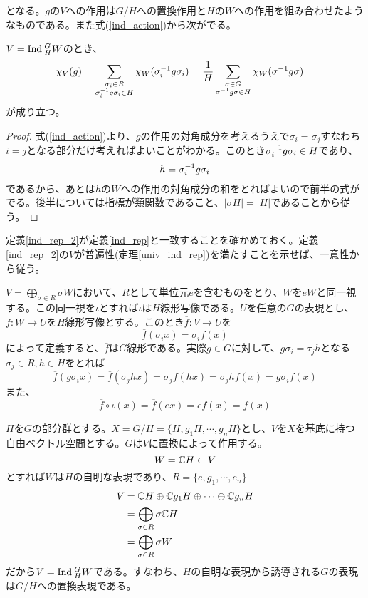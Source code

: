 \documentclass{ltjsreport}
\begin{document}
となる。$g$の$V$への作用は$G/H$への置換作用と$H$の$W$への作用を組み合わせたようなものである。また式(\ref{ind_action})から次がでる。

\begin{prop}[誘導表現の指標]\label{ind_char}
  $V=\text{Ind}\:_H^GW$のとき、
  \begin{align}
  \chi_V(g)&=\sum_{\substack{\sigma_i\in R \\ \sigma_i^{-1}g\sigma_i\in H}}\chi_W(\sigma_i^{-1}g\sigma_i)
  =\frac{1}{H}\sum_{\substack{\sigma\in G \\ \sigma^{-1}g\sigma\in H}}\chi_W(\sigma^{-1}g\sigma)
\end{align}
が成り立つ。
\end{prop}

\begin{proof}
  式(\ref{ind_action})より、$g$の作用の対角成分を考えるうえで$\sigma_i=\sigma_j$すなわち$i=j$となる部分だけ考えればよいことがわかる。このとき$\sigma_i^{-1}g\sigma_i\in H$であり、
  \[
  h=\sigma_i^{-1}g\sigma_i 
  \]
  であるから、あとは$h$の$W$への作用の対角成分の和をとればよいので前半の式がでる。後半については指標が類関数であること、$|\sigma H|=|H|$であることから従う。
\end{proof}

定義\ref{ind_rep_2}が定義\ref{ind_rep}と一致することを確かめておく。定義\ref{ind_rep_2}の$V$が普遍性(定理\ref{univ_ind_rep})を満たすことを示せば、一意性から従う。

$V=\bigoplus_{\sigma\in R}\sigma W$において、$R$として単位元$e$を含むものをとり、$W$を$eW$と同一視する。この同一視を$\iota$とすれば$\iota$は$H$線形写像である。$U$を任意の$G$の表現とし、$f:W\rightarrow U$を$H$線形写像とする。このとき$\overline{f}:V\rightarrow U$を
\[
\overline{f}(\sigma_i x)=\sigma_i f(x)
\]
によって定義すると、$\overline{f}$は$G$線形である。実際$g\in G$に対して、$g\sigma_i =\tau_j h$となる$\sigma_j\in R, h\in H$をとれば
\[
\overline{f}(g\sigma_i x)=\overline{f}(\sigma_j hx)=\sigma_jf(hx)=\sigma_jhf(x)=g\sigma_if(x)  
\]
また、
\[
\overline{f}\circ\iota(x)=\overline{f}(ex)=ef(x)=f(x)  
\]



\begin{eg}\label{ind_from_trivial}
  $H$を$G$の部分群とする。$X=G/H=\{H,g_1H,\cdots,g_nH\}$とし、$V$を$X$を基底に持つ自由ベクトル空間とする。$G$は$V$に置換によって作用する。
  \[
  W=\mathbb{C} H\subset V  
  \]
  とすれば$W$は$H$の自明な表現であり、$R=\{e,g_1,\cdots,e_n\}$
  \begin{align*}
  V&=\mathbb{C} H\oplus \mathbb{C} g_1H\oplus\cdots\oplus\mathbb{C} g_nH\\
  &=\bigoplus_{\sigma\in R}\sigma\mathbb{C} H\\
  &=\bigoplus_{\sigma\in R}\sigma W
  \end{align*}
  だから$V=\text{Ind}\:_H^GW$である。すなわち、$H$の自明な表現から誘導される$G$の表現は$G/H$への置換表現である。
\end{eg}
\end{document}
